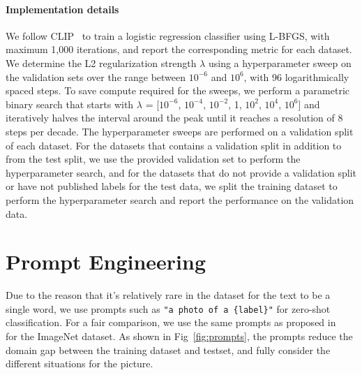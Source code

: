 \paragraph{Implementation details} We follow CLIP~\citep{radford2021learning} to train a logistic regression classifier using L-BFGS, with maximum 1,000 iterations, and report the corresponding metric for each dataset. We determine the L2 regularization strength $\lambda$ using a hyperparameter sweep on the validation sets over the range between $10^{-6}$ and $10^6$, with 96 logarithmically spaced steps. To save compute required for the sweeps, we perform a parametric binary search that starts with $\lambda$ = [$10^{-6}$, $10^{-4}$, $10^{-2}$, 1, $10^2$, $10^4$, $10^6$] and iteratively halves the interval around the peak until it reaches a resolution of 8 steps per decade. The hyperparameter sweeps are performed on a validation split of each dataset. For the datasets that contains a validation split in addition to from the test split, we use the provided validation set to perform the hyperparameter search, and for the datasets that do not provide a validation split or have not published labels for the test data, we split the training dataset to perform the hyperparameter search and report the performance on the validation data.






\section{Prompt Engineering}\label{Prompts}

Due to the reason that it's relatively rare in the dataset for the text to be a single word, we use prompts such as  \texttt{"a photo of a \{label\}"} for zero-shot classification. For a fair comparison, we use the same prompts as proposed in ~\cite{radford2021learning} for the ImageNet dataset. As shown in Fig~\ref{fig:prompts}, the prompts reduce the domain gap between the training dataset and testset, and fully consider the different situations for the picture.

